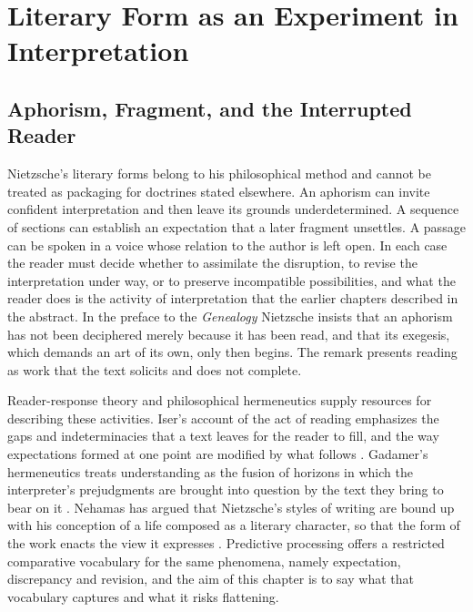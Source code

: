\part{Literary Form as an Experiment in Interpretation}

\chapter{Aphorism, Fragment, and the Interrupted Reader}

Nietzsche's literary forms belong to his philosophical method and cannot be treated as packaging for doctrines stated elsewhere. An aphorism can invite confident interpretation and then leave its grounds underdetermined. A sequence of sections can establish an expectation that a later fragment unsettles. A passage can be spoken in a voice whose relation to the author is left open. In each case the reader must decide whether to assimilate the disruption, to revise the interpretation under way, or to preserve incompatible possibilities, and what the reader does is the activity of interpretation that the earlier chapters described in the abstract. In the preface to the \emph{Genealogy} Nietzsche insists that an aphorism has not been deciphered merely because it has been read, and that its exegesis, which demands an art of its own, only then begins. The remark presents reading as work that the text solicits and does not complete.

Reader-response theory and philosophical hermeneutics supply resources for describing these activities. Iser's account of the act of reading emphasizes the gaps and indeterminacies that a text leaves for the reader to fill, and the way expectations formed at one point are modified by what follows \citep{iser1978}. Gadamer's hermeneutics treats understanding as the fusion of horizons in which the interpreter's prejudgments are brought into question by the text they bring to bear on it \citep{gadamer1989}. Nehamas has argued that Nietzsche's styles of writing are bound up with his conception of a life composed as a literary character, so that the form of the work enacts the view it expresses \citep{nehamas1985}. Predictive processing offers a restricted comparative vocabulary for the same phenomena, namely expectation, discrepancy and revision, and the aim of this chapter is to say what that vocabulary captures and what it risks flattening.

